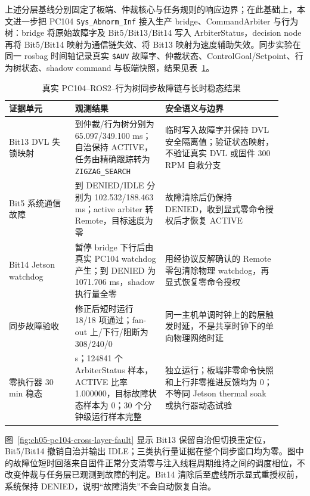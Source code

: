 上述分层基线分别固定了板端、仲裁核心与任务规则的响应边界；在此基础上，本文进一步把 PC104 \texttt{Sys\_Abnorm\_Inf} 接入生产 bridge、CommandArbiter 与行为树：bridge 将原始故障字及 Bit5/Bit13/Bit14 写入 ArbiterStatus，decision node 再将 Bit5/Bit14 映射为通信链失效、将 Bit13 映射为速度辅助失效。同步实验在同一 rosbag 时间轴记录真实 \texttt{\$AUV} 故障字、仲裁状态、ControlGoal/Setpoint、行为树状态、shadow command 与板端快照，结果见表~\ref{tab:ch05-pc104-cross-layer}。

\begin{table}[htbp]
\centering
\scriptsize
\setlength{\tabcolsep}{3.5pt}
\caption{真实 PC104--ROS2--行为树同步故障链与长时稳态结果}\label{tab:ch05-pc104-cross-layer}
\begin{tabular}{@{}>{\raggedright\arraybackslash}p{0.22\linewidth}>{\raggedright\arraybackslash}p{0.30\linewidth}>{\raggedright\arraybackslash}p{0.39\linewidth}@{}}
\toprule
证据单元 & 观测结果 & 安全语义与边界 \\
\midrule
Bit13 DVL 失锁映射 & 到仲裁/行为树分别为 65.097/349.100 ms；自治保持 ACTIVE，任务由精确跟踪转为 \texttt{ZIGZAG\_SEARCH} & 临时写入故障字并保持 DVL 安全隔离值；验证状态映射，不验证真实 DVL 或固件 300 RPM 自救分支 \\
Bit5 系统通信故障 & 到 DENIED/IDLE 分别为 102.532/188.463 ms；active arbiter 转 Remote，目标速度为零 & 故障清除后仍保持 DENIED，收到显式零命令授权后才恢复 ACTIVE \\
Bit14 Jetson watchdog & 暂停 bridge 下行后由真实 PC104 watchdog 产生；到 DENIED 为 1071.706 ms，shadow 执行量全零 & 用经协议反解确认的 Remote 零包清除物理 watchdog，再显式恢复零命令授权 \\
同步故障验收 & 修正后短时运行 18/18 项通过；fan-out 上/下行/阻断为 308/240/0 & 同一主机单调时钟上的跨层触发时延，不是共享时钟下的单向物理网络时延 \\
零执行器 30 min 稳态 & 1800 s；124841 个 ArbiterStatus 样本，ACTIVE 比率 1.000000，目标故障状态样本为 0；30 个分钟级运行样本完整 & 独立运行；板端非零命令快照和上行非零推进反馈均为 0；不等同 Jetson thermal soak 或执行器动态试验 \\
\bottomrule
\end{tabular}
\end{table}

图~\ref{fig:ch05-pc104-cross-layer-fault} 显示 Bit13 保留自治但切换重定位，Bit5/Bit14 撤销自治并输出 IDLE；三类执行量证据在整个同步窗口均为零。图中的故障位短时回落来自固件正常分支清零与注入线程周期维持之间的调度相位，不改变仲裁与任务层已观测到故障的判定。Bit14 清除后至虚线所示显式重授权前，系统保持 DENIED，说明“故障消失”不会自动恢复自治。

